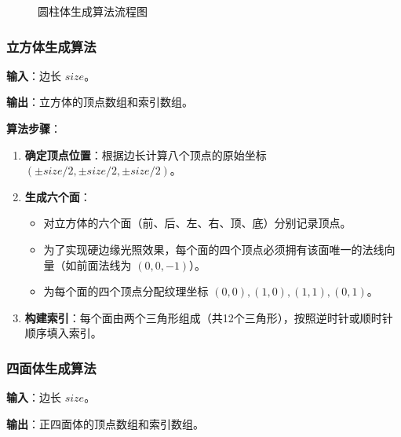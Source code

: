 \documentclass[12pt,a4paper]{article}
\begin{document}
\begin{tcolorbox}
\begin{figure}[H]
\caption{圆柱体生成算法流程图}
\label{fig:cylinder_flow}
\end{figure}
\end{tcolorbox}

\begin{tcolorbox}
\subsubsection{立方体生成算法}

\textbf{输入}：边长 $size$。

\textbf{输出}：立方体的顶点数组和索引数组。

\textbf{算法步骤}：
\begin{enumerate}
    \item \textbf{确定顶点位置}：根据边长计算八个顶点的原始坐标 $(\pm size/2, \pm size/2, \pm size/2)$。
    \item \textbf{生成六个面}：
    \begin{itemize}
        \item 对立方体的六个面（前、后、左、右、顶、底）分别记录顶点。
        \item 为了实现硬边缘光照效果，每个面的四个顶点必须拥有该面唯一的法线向量（如前面法线为 $(0, 0, -1)$）。
        \item 为每个面的四个顶点分配纹理坐标 $(0,0), (1,0), (1,1), (0,1)$。
    \end{itemize}
    \item \textbf{构建索引}：每个面由两个三角形组成（共12个三角形），按照逆时针或顺时针顺序填入索引。
\end{enumerate}

\subsubsection{四面体生成算法}

\textbf{输入}：边长 $size$。

\textbf{输出}：正四面体的顶点数组和索引数组。


\end{tcolorbox}
\end{document}
